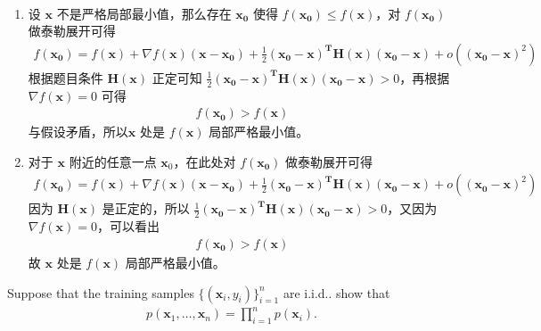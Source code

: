 \begin{solution}
	\heiti
	\ \\
	\begin{enumerate}
		\item 设 $\mathbf{x}$ 不是严格局部最小值，那么存在 $\mathbf{x_0}$ 使得 $f(\mathbf{x_0}) \leq f(\mathbf{x})$，对 $f(\mathbf{x_0})$ 做泰勒展开可得
			\begin{align*}
				f(\mathbf{x_0}) = f(\mathbf{x}) + \nabla f(\mathbf{x})(\mathbf{x} - \mathbf{x_0}) + \frac{1}{2}(\mathbf{x_0} - \mathbf{x})^\mathbf{T}\mathbf{H}(\mathbf{x})(\mathbf{x_0} - \mathbf{x}) + o((\mathbf{x_0} - \mathbf{x})^2)
			\end{align*}
		根据题目条件 $\mathbf{H}(\mathbf{x})$ 正定可知 $\frac{1}{2}(\mathbf{x_0} - \mathbf{x})^\mathbf{T}\mathbf{H}(\mathbf{x})(\mathbf{x_0} - \mathbf{x}) > 0$，再根据$\nabla f(\mathbf{x})=0$ 可得
			\begin{align*}
				f(\mathbf{x_0}) > f(\mathbf{x})
			\end{align*}
		与假设矛盾，所以$\mathbf{x}$ 处是 $f(\mathbf{x})$ 局部严格最小值。
		\item 对于 $\mathbf{x}$ 附近的任意一点 $\mathbf{x}_0$，在此处对 $f(\mathbf{\mathbf{x}_0})$ 做泰勒展开可得
			\begin{align*}
				f(\mathbf{x_0}) = f(\mathbf{x}) + \nabla f(\mathbf{x})(\mathbf{x} - \mathbf{x_0}) + \frac{1}{2}(\mathbf{x_0} - \mathbf{x})^\mathbf{T}\mathbf{H}(\mathbf{x})(\mathbf{x_0} - \mathbf{x}) + o((\mathbf{x_0} - \mathbf{x})^2)
			\end{align*}
			因为 $\mathbf{H}(\mathbf{x})$ 是正定的，所以 $\frac{1}{2}(\mathbf{x_0} - \mathbf{x})^\mathbf{T}\mathbf{H}(\mathbf{x})(\mathbf{x_0} - \mathbf{x}) > 0$，又因为 $\nabla f(\mathbf{x})=0$，可以看出
				\begin{align*}
					f(\mathbf{x_0}) > f(\mathbf{x})
				\end{align*}
			故 $\mathbf{x}$ 处是 $f(\mathbf{x})$ 局部严格最小值。
	\end{enumerate}

\end{solution}
\newpage

\begin{exercise}
	Suppose that the training samples $\{(\mathbf{x}_i,y_i)\}_{i=1}^n$ are i.i.d.. show that
	\begin{align*}
	    p(\mathbf{x}_1,\ldots,\mathbf{x}_n)=\prod_{i=1}^np(\mathbf{x}_i).
	\end{align*}
	
\end{exercise}

